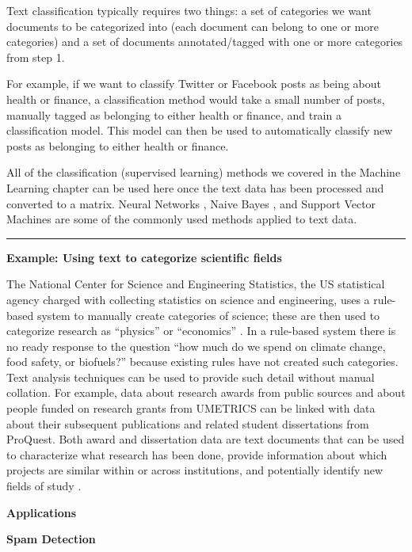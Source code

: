 \documentclass[]{krantz}
\begin{document}
Text classification typically requires two things: a set of categories
we want documents to be categorized into (each document can belong to
one or more categories) and a set of documents annotated/tagged with one
or more categories from step 1.

For example, if we want to classify Twitter or Facebook posts as being
about health or finance, a classification method would take a small
number of posts, manually tagged as belonging to either health or
finance, and train a classification model. This model can then be used
to automatically classify new posts as belonging to either health or
finance.

All of the classification (supervised learning) methods we covered in
the Machine Learning chapter can be used here once the text data has
been processed and converted to a matrix. Neural Networks
\citep{iyyer-15}, Naive Bayes \citep{lewis-05}, and Support Vector
Machines \citep{zhu-13} are some of the commonly used methods applied to
text data.

\begin{center}\rule{0.5\linewidth}{\linethickness}\end{center}

\textbf{Example: Using text to categorize scientific fields}

The National Center for Science and Engineering Statistics, the US
statistical agency charged with collecting statistics on science and
engineering, uses a rule-based system to manually create categories of
science; these are then used to categorize research as ``physics'' or
``economics'' \citep{oecd2005measurement, manual2004summary}. In a
rule-based system there is no ready response to the question ``how much
do we spend on climate change, food safety, or biofuels?'' because
existing rules have not created such categories. Text analysis
techniques can be used to provide such detail without manual collation.
For example, data about research awards from public sources and about
people funded on research grants from UMETRICS can be linked with data
about their subsequent publications and related student dissertations
from ProQuest. Both award and dissertation data are text documents that
can be used to characterize what research has been done, provide
information about which projects are similar within or across
institutions, and potentially identify new fields of study
\citep{talley2011database}.

\textbf{Applications}

\textbf{Spam Detection}
\end{document}
